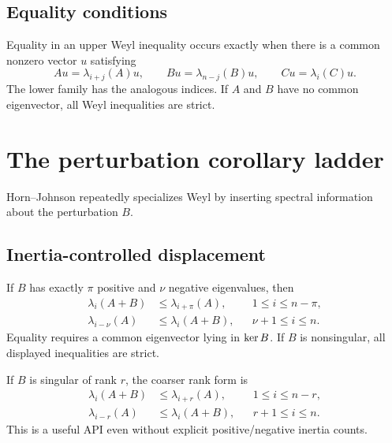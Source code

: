 \subsection{Equality conditions}

Equality in an upper Weyl inequality occurs exactly when there is a common nonzero vector $u$ satisfying
\[
  Au=\lambda_{i+j}(A)u,
  \qquad
  Bu=\lambda_{n-j}(B)u,
  \qquad
  Cu=\lambda_i(C)u.
\]
The lower family has the analogous indices. If $A$ and $B$ have no common eigenvector, all Weyl inequalities are strict.


\section{The perturbation corollary ladder}


Horn--Johnson repeatedly specializes Weyl by inserting spectral information about the perturbation $B$.

\subsection{Inertia-controlled displacement}

If $B$ has exactly $\pi$ positive and $\nu$ negative eigenvalues, then
\begin{align*}
  \lambda_i(A+B)&\le\lambda_{i+\pi}(A), &&1\le i\le n-\pi,\\
  \lambda_{i-\nu}(A)&\le\lambda_i(A+B), &&\nu+1\le i\le n.
\end{align*}
Equality requires a common eigenvector lying in $\operatorname{ker} B$. If $B$ is nonsingular, all displayed inequalities are strict.

If $B$ is singular of rank $r$, the coarser rank form is
\begin{align*}
  \lambda_i(A+B)&\le\lambda_{i+r}(A), &&1\le i\le n-r,\\
  \lambda_{i-r}(A)&\le\lambda_i(A+B), &&r+1\le i\le n.
\end{align*}
This is a useful API even without explicit positive/negative inertia counts.

